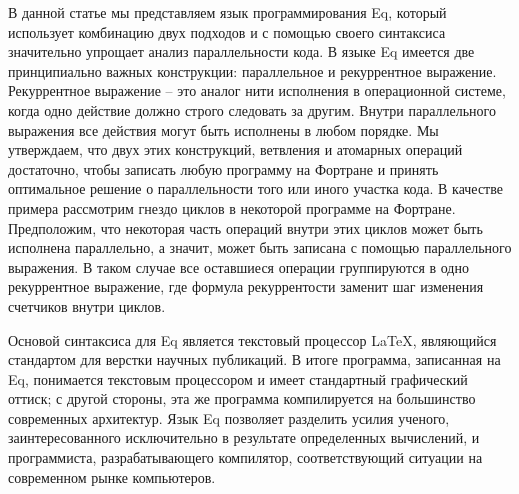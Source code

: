 \documentclass[a4paper]{llncs}
\begin{document}
В данной статье мы представляем язык программирования Eq, который
использует комбинацию двух подходов и с помощью своего синтаксиса
значительно упрощает анализ параллельности кода.  В языке Eq имеется
две принципиально важных конструкции: параллельное и рекуррентное
выражение.  Рекуррентное выражение -- это аналог нити исполнения в
операционной системе, когда одно действие должно строго следовать за
другим.  Внутри параллельного выражения все действия могут быть
исполнены в любом порядке.  Мы утверждаем, что двух этих конструкций,
ветвления и атомарных операций достаточно, чтобы записать любую
программу на Фортране и принять оптимальное решение о параллельности
того или иного участка кода.  В качестве примера рассмотрим гнездо
циклов в некоторой программе на Фортране.  Предположим, что некоторая
часть операций внутри этих циклов может быть исполнена параллельно, а
значит, может быть записана с помощью параллельного выражения.  В
таком случае все оставшиеся операции группируются в одно рекуррентное
выражение, где формула рекуррентости заменит шаг изменения счетчиков
внутри циклов.  

Основой синтаксиса для Eq является текстовый процессор \LaTeX,
являющийся стандартом для верстки научных публикаций.  В итоге
программа, записанная на Eq, понимается текстовым процессором и имеет
стандартный графический оттиск; с другой стороны, эта же программа
компилируется на большинство современных архитектур.  Язык Eq
позволяет разделить усилия ученого, заинтересованного исключительно в
результате определенных вычислений, и программиста, разрабатывающего
компилятор, соответствующий ситуации на современном рынке компьютеров.
\end{document}

